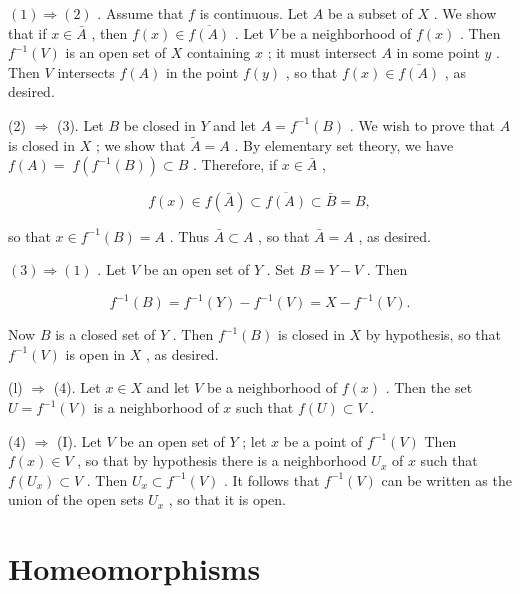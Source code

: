 \documentclass[10pt]{article}
\begin{document}
\(\left( 1\right)  \Rightarrow  \left( 2\right)\) . Assume that \(f\) is continuous. Let \(A\) be a subset of \(X\) . We show that if \(x \in  \bar{A}\) , then \(f\left( x\right)  \in  \overline{f\left( A\right) }\) . Let \(V\) be a neighborhood of \(f\left( x\right)\) . Then \({f}^{-1}\left( V\right)\) is an open set of \(X\) containing \(x\) ; it must intersect \(A\) in some point \(y\) . Then \(V\) intersects \(f\left( A\right)\) in the point \(f\left( y\right)\) , so that \(f\left( x\right)  \in  \overline{f\left( A\right) }\) , as desired.

(2) \(\Rightarrow\) (3). Let \(B\) be closed in \(Y\) and let \(A = {f}^{-1}\left( B\right)\) . We wish to prove that \(A\) is closed in \(X\) ; we show that \(\widetilde{A} = A\) . By elementary set theory, we have \(f\left( A\right)  = \; f\left( {{f}^{-1}\left( B\right) }\right)  \subset  B\) . Therefore, if \(x \in  \bar{A}\) ,

\[
f\left( x\right)  \in  f\left( \bar{A}\right)  \subset  \overline{f\left( A\right) } \subset  \bar{B} = B,
\]

so that \(x \in  {f}^{-1}\left( B\right)  = A\) . Thus \(\bar{A} \subset  A\) , so that \(\bar{A} = A\) , as desired.

\(\left( 3\right)  \Rightarrow  \left( 1\right)\) . Let \(V\) be an open set of \(Y\) . Set \(B = Y - V\) . Then

\[
{f}^{-1}\left( B\right)  = {f}^{-1}\left( Y\right)  - {f}^{-1}\left( V\right)  = X - {f}^{-1}\left( V\right) .
\]

Now \(B\) is a closed set of \(Y\) . Then \({f}^{-1}\left( B\right)\) is closed in \(X\) by hypothesis, so that \({f}^{-1}\left( V\right)\) is open in \(X\) , as desired.

(l) \(\Rightarrow\) (4). Let \(x \in  X\) and let \(V\) be a neighborhood of \(f\left( x\right)\) . Then the set \(U = {f}^{-1}\left( V\right)\) is a neighborhood of \(x\) such that \(f\left( U\right)  \subset  V\) .

(4) \(\Rightarrow\) (I). Let \(V\) be an open set of \(Y\) ; let \(x\) be a point of \({f}^{-1}\left( V\right)\) Then \(f\left( x\right)  \in  V\) , so that by hypothesis there is a neighborhood \({U}_{x}\) of \(x\) such that \(f\left( {U}_{x}\right)  \subset  V\) . Then \({U}_{x} \subset  {f}^{-1}\left( V\right)\) . It follows that \({f}^{-1}\left( V\right)\) can be written as the union of the open sets \({U}_{x}\) , so that it is open.

\section*{Homeomorphisms}
\end{document}
